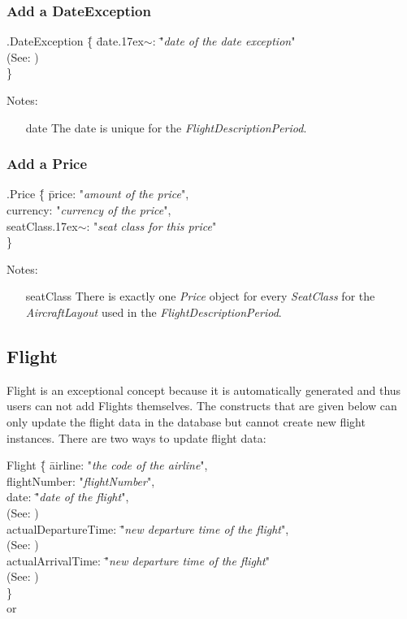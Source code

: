\documentclass[a4paper,11pt]{article}
\newcommand{\dsltype}[1]{\textit{#1}}
\newcommand{\mytilde}{{\raise.17ex\hbox{\(\scriptstyle\sim\)}}}
\begin{document}
\subsubsection*{Add a DateException}
\begin{tabbing}
.DateException \= \{ \= date\mytilde: \= "\textit{date of the date exception}" \\
        \> \> \>(See: ) \\
\> \} \\
\end{tabbing}
Notes:
\begin{enumerate}
\item[date] The date is unique for the \dsltype{FlightDescriptionPeriod}.
\end{enumerate}

\subsubsection*{Add a Price}
\begin{tabbing}
.Price \= \{ \= price: "\textit{amount of the price}", \\
	\> \> currency: "\textit{currency of the price}", \\
	\> \> seatClass\mytilde: "\textit{seat class for this price}" \\
\> \} \\
\end{tabbing}
Notes:
\begin{enumerate}
\item[seatClass] There is exactly one \dsltype{Price} object for every \dsltype{SeatClass} for the \dsltype{AircraftLayout} used in the \dsltype{FlightDescriptionPeriod}.
\end{enumerate}

\subsection*{Flight}
Flight is an exceptional concept because it is automatically generated and thus users can not add Flights themselves. The constructs that are given below can only update the flight data in the database but cannot create new flight instances.
There are two ways to update flight data:

\begin{tabbing}
Flight \= \{ \= airline: "\textit{the code of the airline}", \\
	\> \> flightNumber: "\textit{flightNumber}", \\
	\> \> date: \= "\textit{date of the flight}", \\
        \> \> \>(See: ) \\
	\> \> actualDepartureTime: \= "\textit{new departure time of the flight}", \\
        \> \> \>(See: ) \\
	\> \> actualArrivalTime: \= "\textit{new departure time of the flight}" \\
        \> \> \>(See: ) \\
\> \} \\

or
\end{tabbing}
\end{document}
